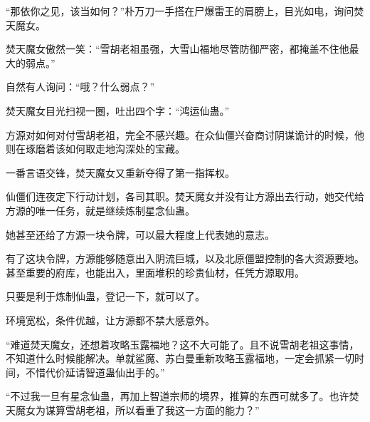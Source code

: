 \begin{this_body}
“那依你之见，该当如何？”朴万刀一手搭在尸爆雷王的肩膀上，目光如电，询问焚天魔女。

焚天魔女傲然一笑：“雪胡老祖虽强，大雪山福地尽管防御严密，都掩盖不住他最大的弱点。”

自然有人询问：“哦？什么弱点？”

焚天魔女目光扫视一圈，吐出四个字：“鸿运仙蛊。”

方源对如何对付雪胡老祖，完全不感兴趣。在众仙僵兴奋商讨阴谋诡计的时候，他则在琢磨着该如何取走地沟深处的宝藏。

一番言语交锋，焚天魔女又重新夺得了第一指挥权。

仙僵们连夜定下行动计划，各司其职。焚天魔女并没有让方源出去行动，她交代给方源的唯一任务，就是继续炼制星念仙蛊。

她甚至还给了方源一块令牌，可以最大程度上代表她的意志。

有了这块令牌，方源能够随意出入阴流巨城，以及北原僵盟控制的各大资源要地。甚至重要的府库，也能出入，里面堆积的珍贵仙材，任凭方源取用。

只要是利于炼制仙蛊，登记一下，就可以了。

环境宽松，条件优越，让方源都不禁大感意外。

“难道焚天魔女，还想着攻略玉露福地？这不大可能了。且不说雪胡老祖这事情，不知道什么时候能解决。单就鲨魔、苏白曼重新攻略玉露福地，一定会抓紧一切时间，不惜代价延请智道蛊仙出手的。”

“不过我一旦有星念仙蛊，再加上智道宗师的境界，推算的东西可就多了。也许焚天魔女为谋算雪胡老祖，所以看重了我这一方面的能力？”

\end{this_body}

